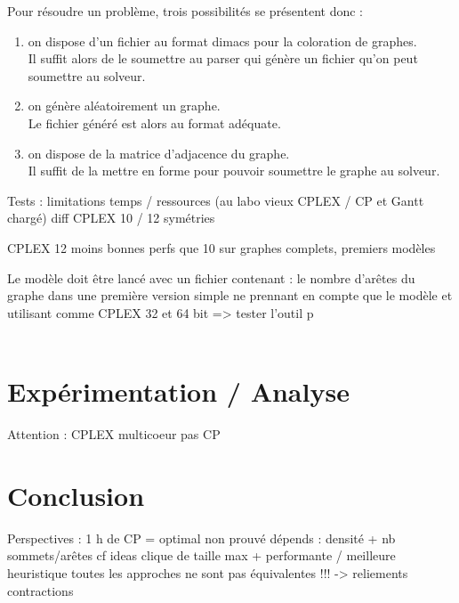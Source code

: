 Pour résoudre un problème, trois possibilités se présentent donc :
\begin{enumerate}
 \item on dispose d'un fichier au format dimacs pour la coloration de graphes.\\
    Il suffit alors de le soumettre au parser qui génère un fichier qu'on peut soumettre au solveur.
 \item on génère aléatoirement un graphe.\\
    Le fichier généré est alors au format adéquate.
 \item on dispose de la matrice d'adjacence du graphe.\\
    Il suffit de la mettre en forme pour pouvoir soumettre le graphe au solveur.
\end{enumerate}


Tests : limitations temps / ressources (au labo vieux CPLEX / CP et Gantt chargé)
diff CPLEX 10 / 12 symétries

CPLEX 12 moins bonnes perfs que 10 sur graphes complets, premiers modèles


Le modèle doit être lancé avec un fichier contenant :
le nombre d'arêtes du graphe
 dans une première version
simple ne prennant en compte que le modèle et utilisant comme 
CPLEX 32 et 64 bit => tester l'outil
p\\\\
\section{Expérimentation / Analyse}
\label{tests}
Attention : CPLEX multicoeur pas CP
\section{Conclusion}
Perspectives : 1 h de CP = optimal non prouvé
dépends : densité + nb sommets/arêtes
cf ideas
clique de taille max + performante / meilleure heuristique
toutes les approches ne sont pas équivalentes !!! -> reliements contractions